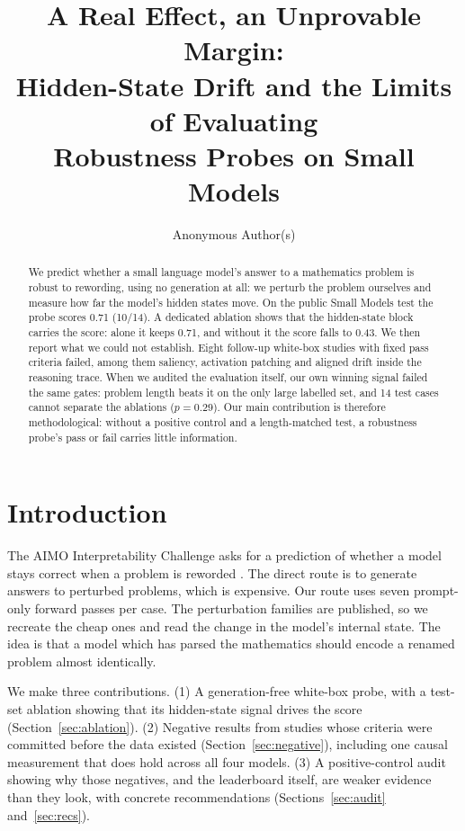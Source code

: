 \documentclass{article}
\title{A Real Effect, an Unprovable Margin:\\Hidden-State Drift and the Limits of Evaluating\\Robustness Probes on Small Models}
\author{Anonymous Author(s)}
\begin{document}
\maketitle

\begin{abstract}
We predict whether a small language model's answer to a mathematics problem is robust to rewording, using no generation at all: we perturb the problem ourselves and measure how far the model's hidden states move. On the public Small Models test the probe scores 0.71 (10/14). A dedicated ablation shows that the hidden-state block carries the score: alone it keeps 0.71, and without it the score falls to 0.43. We then report what we could not establish. Eight follow-up white-box studies with fixed pass criteria failed, among them saliency, activation patching and aligned drift inside the reasoning trace. When we audited the evaluation itself, our own winning signal failed the same gates: problem length beats it on the only large labelled set, and 14 test cases cannot separate the ablations ($p=0.29$). Our main contribution is therefore methodological: without a positive control and a length-matched test, a robustness probe's pass or fail carries little information.
\end{abstract}

\section{Introduction}

The AIMO Interpretability Challenge asks for a prediction of whether a model stays correct when a problem is reworded \cite{aimo}. The direct route is to generate answers to perturbed problems, which is expensive. Our route uses seven prompt-only forward passes per case. The perturbation families are published, so we recreate the cheap ones and read the change in the model's internal state. The idea is that a model which has parsed the mathematics should encode a renamed problem almost identically.

We make three contributions. (1) A generation-free white-box probe, with a test-set ablation showing that its hidden-state signal drives the score (Section~\ref{sec:ablation}). (2) Negative results from studies whose criteria were committed before the data existed (Section~\ref{sec:negative}), including one causal measurement that does hold across all four models. (3) A positive-control audit showing why those negatives, and the leaderboard itself, are weaker evidence than they look, with concrete recommendations (Sections~\ref{sec:audit} and~\ref{sec:recs}).
\end{document}
